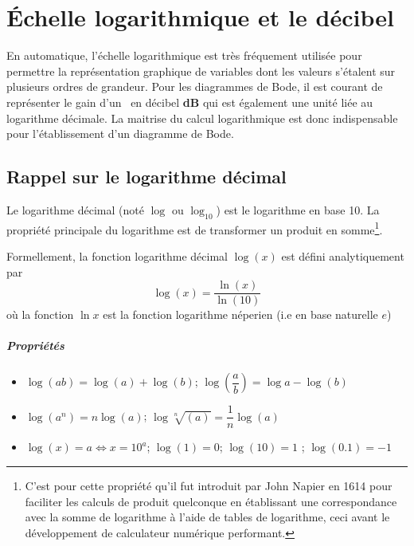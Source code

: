 \chapter{\'Echelle logarithmique et le décibel~\label{annexe-log}}

En automatique, l'échelle logarithmique est très fréquement 
utilisée pour permettre la représentation
graphique de variables dont les valeurs s'étalent sur plusieurs ordres de grandeur. 
Pour les diagrammes de Bode, il est courant de représenter le gain 
d'un \SLCI~en décibel \textbf{dB} qui est également une unité liée au logarithme décimale. 
La maitrise du calcul logarithmique est donc indispensable 
pour l'établissement d'un diagramme de Bode.

\section{Rappel sur le logarithme décimal}
Le logarithme décimal (noté $\log$ ou $\log_{10}$) est le logarithme en base 10.
La propriété principale du logarithme est de transformer un 
produit en somme\footnote{C'est pour cette propriété qu'il 
fut introduit par John Napier en 1614 pour faciliter les calculs de produit quelconque
en établissant une correspondance avec la somme de logarithme 
à l'aide de tables de logarithme, ceci avant le 
développement de calculateur numérique performant.}.

Formellement, la fonction logarithme décimal $\log{(x)}$ est défini analytiquement par 
$$
\log{(x)}=\dfrac{\ln{(x)}}{\ln{(10)}}
$$
où la fonction $\ln{x}$ est la fonction logarithme néperien (i.e en base naturelle $e$) 

\paragraph{Propriétés}
\begin{itemize}
    \item $\log{(ab)}=\log{(a)} + \log{(b)}$; $\log{\left(\dfrac{a}{b}\right)}=\log{a} - \log{(b)}$
    \item $\log{(a^n)}=n\log{(a)}$; $\log{\sqrt[n]{(a)}}=\dfrac{1}{n}\log{(a)}$
    \item $\log(x)=a \Leftrightarrow x=10^a $; $\log(1) = 0$; $\log(10) = 1$ ; $\log(0.1) = -1$
\end{itemize}


